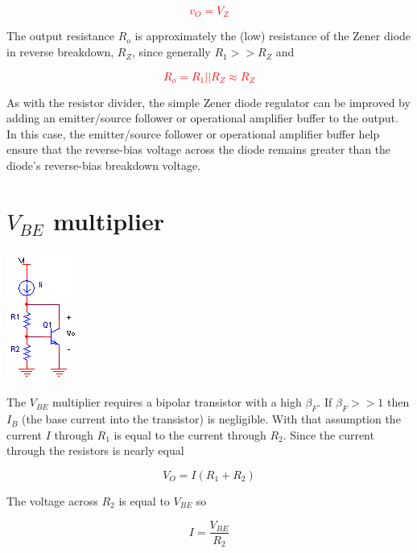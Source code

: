 \textcolor{red}{
\begin{equation}
v_{O} = V_{Z}
\end{equation}
}

\noindent The output resistance $R_{o}$ is approximately the (low) resistance of the Zener diode in reverse breakdown, $R_{Z}$, since generally $R_{1} >> R_{Z}$ and

\textcolor{red}{
\begin{equation}
R_{o} = R_{1}||R_{Z} \approx R_{Z}
\end{equation}
}

As with the resistor divider, the simple Zener diode regulator can be improved by adding an emitter/source follower or operational amplifier buffer to the output. In this case, the emitter/source follower or operational amplifier buffer help ensure that the reverse-bias voltage across the diode remains greater than the diode's reverse-bias breakdown voltage.

\section{$V_{BE}$ multiplier}
\begin{center}
	\includegraphics{schematics/vbe_multiplier.PNG}
\end{center}

The $V_{BE}$ multiplier requires a bipolar transistor with a high $\beta_{F}$. If $\beta_{F} >> 1$ then $I_{B}$ (the base current into the transistor) is negligible. With that assumption the current $I$ through $R_{1}$ is equal to the current through $R_{2}$. Since the current through the resistors is nearly equal

\begin{equation}
V_{O} = I(R_{1}+R_{2})
\end{equation}

\noindent The voltage across $R_{2}$ is equal to $V_{BE}$ so

\begin{equation}
I = \frac{V_{BE}}{R_{2}}
\end{equation}

